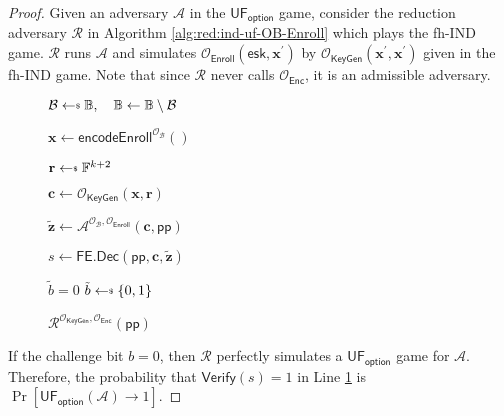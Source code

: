 \begin{proof}

Given an adversary $\mathcal{A}$ in the $\textsf{UF}_{\textsf{option}}$ game, consider the reduction adversary $\mathcal{R}$ in Algorithm \ref{alg:red:ind-uf-OB-Enroll} which plays the \textsf{fh-IND} game. $\mathcal{R}$ runs $\mathcal{A}$ and simulates $\mathcal{O}_{\textsf{Enroll}}( \textsf{esk}, \mathbf{x}^\prime )$  by $\mathcal{O}_{\textsf{KeyGen}}(\mathbf{x}^\prime, \mathbf{x}^\prime)$ given in the \textsf{fh-IND} game.  Note that since $\mathcal{R}$ never calls $\mathcal{O}_{\textsf{Enc}}$, it is an admissible adversary.

\begin{figure}[h]
\centering
	
	\begin{minipage}[t]{0.5\linewidth}
	\centering
	\begin{algorithm}[H]
	\caption{$\mathcal{R}^{\mathcal{O}_{\textsf{KeyGen}}, \mathcal{O}_{\textsf{Enc}}}(\textsf{pp})$}
	\label{alg:red:ind-uf-OB-Enroll}
	\begin{algorithmic}[1]
		\State $\mathcal{B} \getsdollar \mathbb{B}, \quad \mathbb{B} \gets \mathbb{B} \setminus \mathcal{B}$ \label{alg:red:ind-uf-OB-Enroll:B}

		\State $\mathbf{x} \gets \textsf{encodeEnroll}^{\mathcal{O}_{\mathcal{B}}}()$

		\State $\mathbf{r} \getsdollar \mathbb{F}^{k+2}$
		
		\State $\mathbf{c} \gets \mathcal{O}_{\textsf{KeyGen}}(\mathbf{x}, \mathbf{r})$ \label{alg:red:ind-uf-OB-Enroll:c}

		\State ${\mathbf{\tilde{z}}} \gets {\mathcal{A}}^{\mathcal{O}_\mathcal{B}, \mathcal{O}_\textsf{Enroll} } ( \mathbf{c}, \textsf{pp})$ \label{alg:red:ind-uf-OB-Enroll:A}

		\State $s \gets \textsf{FE.Dec}( \textsf{pp}, \mathbf{c}, \mathbf{\tilde{z}} )$

		 \label{alg:red:ind-uf-OB-Enroll:verify}
			\State \Return $\tilde{b} = 0$
		\Else
			\State \Return $\tilde{b} \getsdollar \{0, 1\}$
		\EndIf

	\end{algorithmic}
	\end{algorithm}
	\end{minipage}
	
\end{figure}

	If the challenge bit $b = 0$, then $\mathcal{R}$ perfectly simulates a $\textsf{UF}_{\textsf{option}}$ game for $\mathcal{A}$. Therefore, the probability that $\textsf{Verify}(s) = 1$ in Line \ref{alg:red:ind-uf-OB-Enroll:verify} is $\Pr[\textsf{UF}_{\textsf{option}}(\mathcal{A}) \to 1]$.


\end{proof}
